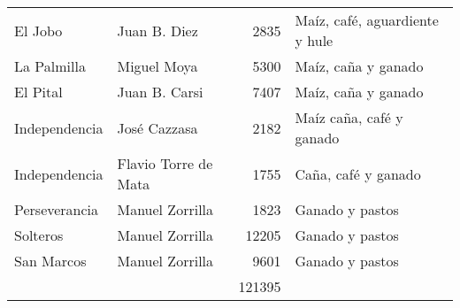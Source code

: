\documentclass[14pt,twoside,final]{extbook} %
\begin{document}
\begin{sidewaystable}
\begin{small}
\begin{tabular}{@{}llrl@{}}
El Jobo\index[lugares]{Jobo, El!hacienda} & Juan B. Diez\index[nombres]{Diez, Juan B.} & 2835 & Maíz, café, aguardiente y hule \\
La Palmilla\index[lugares]{Palmilla, La!hacienda} & Miguel Moya\index[nombres]{Moya, Miguel} & 5300 & Maíz, caña y ganado \\
El Pital\index[lugares]{Pital, El!hacienda} & Juan B. Carsi\index[nombres]{Carsi, Juan B.} & 7407 & Maíz, caña y ganado \\
Independencia\index[lugares]{Independencia!hacienda} & José Cazzasa\index[nombres]{Cazzasa, Jose@Cazzasa, José} & 2182 & Maíz caña, café y ganado \\
Independencia\index[lugares]{Independencia!hacienda} & Flavio Torre de Mata\index[nombres]{Torre de Mata, Flavio} & 1755 & Caña, café y ganado \\
Perseverancia\index[lugares]{Perseverancia!hacienda} & Manuel Zorrilla\index[nombres]{Zorrilla, Manuel} & 1823 & Ganado y pastos \\
Solteros\index[lugares]{Solteros!hacienda} & Manuel Zorrilla & 12205 & Ganado y pastos \\
San Marcos\index[lugares]{San Marcos!hacienda} & Manuel Zorrilla & 9601 & Ganado y pastos \\
\midrule
{} & {} & 121395 & {} \\
\bottomrule
\end{tabular}
\end{small}
\caption*{\textsc{Fuente:} Falcón y García, 1986, pp. 36--37; Soledad García Morales, «Análisis de la Estadística de 1907. Haciendas y hacendados» en Mirna Benítez; Carmen Blázquez Domínguez \emph{et al., Veracruz. Un tiempo para contar. Memoria del 1"er Seminario de Historia Regional.} Universidad Veracruzana Instituto Nacional de Antropología e Historia, México, 1989, pp. 166--167. \\ \textsu{*} maíz, trigo, cebada.}
\label{tab:haciendas-1907}
\end{sidewaystable}
\end{document}
